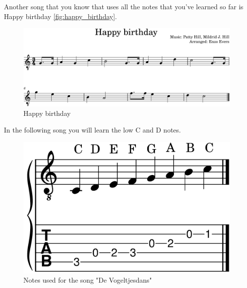 Another song that you know that uses all the notes that you've learned so far is Happy birthday {\autoref{fig:happy_birthday}}. 

\begin{figure}[h]
	\centering
	\includegraphics[width=\textwidth]{../../MuseScore/Guitar/GuitarHappyBirthday.png}
	\caption{Happy birthday}
	\label{fig:happy_birthday}
\end{figure}

\newpage

In the following song you will learn the low C and D notes.

\begin{figure}[h]
	\centering
	\includegraphics[height=0.12\textheight]{../../MuseScore/Guitar/GuitarNotesUsedInVogeltjesdans.png}
	\caption{Notes used for the song "De Vogeltjesdans"}
	\label{fig:guitar_notes_for_vogeltjesdans}
\end{figure}



